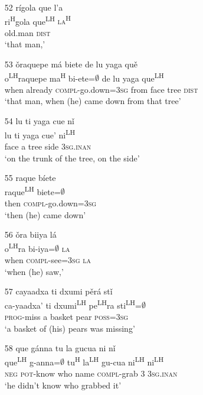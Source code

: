 \begin{itemize}
\item[52]
\glll r\'{i}gola que l'{a}\\
ri\textsuperscript{H}gola que\textsuperscript{LH} \textsc{la\textsuperscript{H}}\\
old.man \textsc{dist}\\
\glt `that man,'


\item[53]
\glll \v{o}raquepe m\'{a} biete de lu yaga qu\v{e}\\
o\textsuperscript{LH}raquepe ma\textsuperscript{H} bi-ete=$\emptyset$ de lu yaga que\textsuperscript{LH}\\
when already \textsc{compl}-go.down=\textsc{3sg} from face tree \textsc{dist}\\
\glt `that man, when (he) came down from that tree'


\item[54]
\glll lu ti yaga cue n\v{i}\\
lu ti yaga cue' ni\textsuperscript{LH}\\
face a tree side \textsc{3sg.inan}\\
\glt `on the trunk of the tree, on the side'


\item[55]
\glll raque b\'{i}ete\\
raque\textsuperscript{LH}  biete=$\emptyset$\\
then \textsc{compl}-go.down=\textsc{3sg}\\
\glt `then (he) came down'


\item[56]
\glll \v{o}ra biiya l\'{a}\\
o\textsuperscript{LH}ra bi-iya=$\emptyset$ \textsc{la}\\
when \textsc{compl}-see=\textsc{3sg} \textsc{la}\\
\glt  `when (he) saw,'


\item[57]
\glll cayaadxa ti dxumi p\v{e}r\'{a} st\v{i}\\
ca-yaadxa' ti dxumi\textsuperscript{LH} pe\textsuperscript{LH}ra sti\textsuperscript{LH}=$\emptyset$\\
\textsc{prog}-miss a basket pear \textsc{poss}=\textsc{3sg}\\
\glt  `a basket of (his) pears was missing'


\item[58]
\glll que g\'{a}nna tu la gucua ni n\v{i}\\
que\textsuperscript{LH} g-anna=$\emptyset$ tu\textsuperscript{H} la\textsuperscript{LH} gu-cua ni\textsuperscript{LH} ni\textsuperscript{LH}\\
\textsc{neg} \textsc{pot}-know who name \textsc{compl}-grab \textsc{3} \textsc{3sg.inan}\\
\glt `he didn't know who grabbed it'



\end{itemize}
